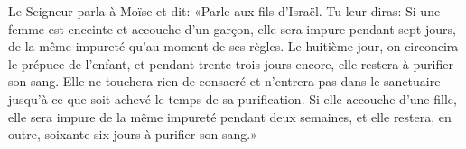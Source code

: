 Le Seigneur parla à Moïse et dit:
	«Parle aux fils d’Israël. Tu leur diras:
	Si une femme est enceinte et accouche d’un garçon,
	elle sera impure pendant sept jours, de la même impureté qu’au moment de ses règles.
Le huitième jour, on circoncira le prépuce de l’enfant,
	et pendant trente-trois jours encore, elle restera à purifier son sang.
Elle ne touchera rien de consacré et n’entrera pas dans le sanctuaire
	jusqu’à ce que soit achevé le temps de sa purification.
Si elle accouche d’une fille, elle sera impure de la même impureté pendant deux semaines,
	et elle restera, en outre, soixante-six jours à purifier son sang.»

